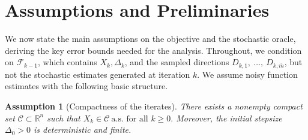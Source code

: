 \documentclass[11pt,a4paper]{article}
\newtheorem{assumption}{Assumption}[section]
\newcommand{\F}{\mathcal{F}}
\newcommand{\D}{\Delta}
\begin{document}
\section{Assumptions and Preliminaries}\label{sec:assumptions}
We now state the main assumptions on the objective and the stochastic oracle, deriving the key error bounds needed for the analysis. Throughout, we condition on $\F_{k-1}$, which contains $X_k, \D_k$, and the sampled directions $D_{k,1}, \ \dots, \ D_{k,\bar{m}}$, but not the stochastic estimates generated at iteration $k$. We assume noisy function estimates with the following basic structure.
\begin{assumption}[Compactness of the iterates]\label{ass:compact}
There exists a nonempty compact set \( {\mathcal C}\subset\mathbb R^n\) such that $X_k\in {\mathcal C} \ \text{a.s. for all $k\ge0$}.$
Moreover, the initial stepsize $\Delta_0>0$ is deterministic and finite.
\end{assumption}
\end{document}

